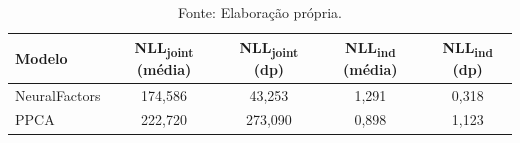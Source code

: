 \begin{table}[H]
\centering
\caption{Negative Log-Likelihood — Conjunto de Teste}
\label{tab:nll}
\begin{tabular}{lcccc}
\hline
\textbf{Modelo}
  & \textbf{NLL\textsubscript{joint} (média)}
  & \textbf{NLL\textsubscript{joint} (dp)}
  & \textbf{NLL\textsubscript{ind} (média)}
  & \textbf{NLL\textsubscript{ind} (dp)} \\
\hline
NeuralFactors & 174{,}586 &  43{,}253 & 1{,}291 & 0{,}318 \\
PPCA          & 222{,}720 & 273{,}090 & 0{,}898 & 1{,}123 \\
\hline
\end{tabular}
\caption*{Fonte: Elaboração própria.}
\end{table}
